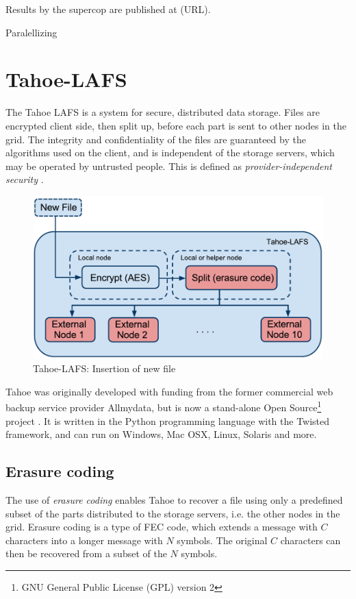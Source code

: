 \documentclass[english,12pt,a4paper]{book}
\begin{document}
Results by the supercop are published at (URL).


Paralellizing

\section{Tahoe-LAFS}

The Tahoe \ac{LAFS} is a system for secure,
distributed data storage. Files are encrypted client side, then
split up, before each part is sent to other nodes in the grid. The integrity and
confidentiality of the files are guaranteed by the algorithms used on the
client, and is independent of the storage servers, which may be operated by
untrusted people. This is defined as \emph{provider-independent security}
\cite{t_tahoe}.

\begin{figure}[h!]
    \centering
    \includegraphics[width=0.9\columnwidth]{Tahoe-newfile.pdf}
    \caption{Tahoe-LAFS: Insertion of new file}
    \label{fig:tahoeinsertion}
\end{figure}

Tahoe was originally developed with funding from the former commercial web
backup service provider Allmydata, but is now a stand-alone Open
Source\footnote{GNU General Public License (GPL) version 2} project \cite{t_ars}.
It is written in the Python programming language with the Twisted framework, and
can run on Windows, Mac OSX, Linux, Solaris and more.

\subsection{Erasure coding}

The use of \emph{erasure coding} enables Tahoe to recover a file using only a
predefined subset of the parts distributed to the storage servers, i.e. the
other nodes in the grid. Erasure coding is a type of \ac{FEC} code, which
extends a message with $C$ characters into a longer message with $N$ symbols.
The original $C$ characters can then be recovered from a subset of the $N$
symbols.
\end{document}

